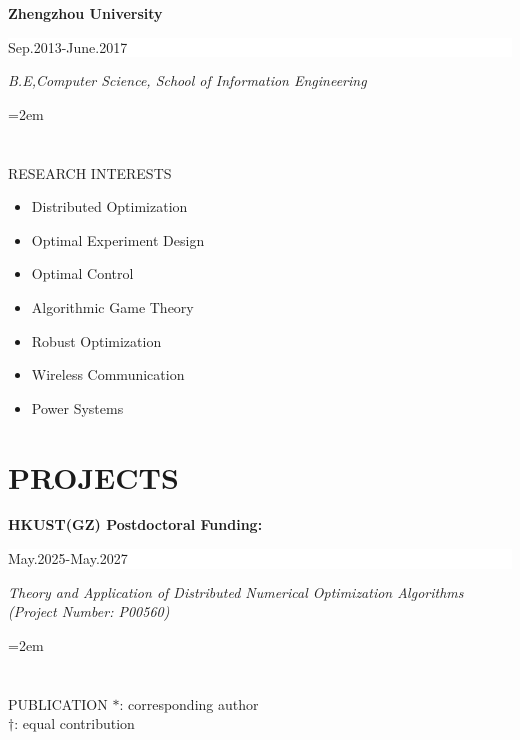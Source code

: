 \documentclass[paper=a4,fontsize=11pt]{scrartcl} %
\newcommand{\sepspace}{\vspace*{1em}}		%
\newcommand{\NewPart}[1]{\section*{\uppercase{#1}}}
\newcommand{\EducationEntry}[4]{
		\noindent \textbf{#1} \hfill      %
		\colorbox{White}{%
			\parbox{5cm}{%
			\hfill\color{Black}#2}} \par  %
		\noindent \textit{#3} \par        %
		\noindent\hangindent=2em\hangafter=0 \small #4 %
		\normalsize \par}
\begin{document}
\sepspace

\EducationEntry{Zhengzhou  University}{Sep.2013-June.2017}{B.E,Computer Science, School of Information Engineering  }

\NewPart{RESEARCH INTERESTS}{}
\begin{itemize}
	
	\item{Distributed Optimization}
	\item{Optimal Experiment Design}
	\item{Optimal Control}
	\item{Algorithmic Game Theory}
	\item{Robust Optimization}
\item{Wireless Communication}
	
	\item{Power Systems}
%	
	
\end{itemize}


\NewPart{PROJECTS}{}

\EducationEntry{HKUST(GZ) Postdoctoral Funding:}{May.2025-May.2027}{Theory and Application of Distributed Numerical Optimization Algorithms (Project Number: P00560)}

\NewPart{PUBLICATION}{}
$*$:  corresponding author\\
$\dag$:  equal contribution\\
\end{document}
